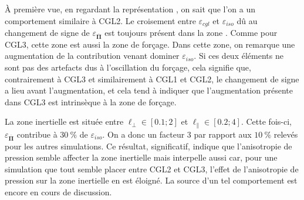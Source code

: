  À première vue, en regardant la représentation , on sait que l'on a un comportement similaire à CGL2. Le croisement entre $\varepsilon_{cgl}$ et $\varepsilon_{iso}$ dû au changement de signe de $\varepsilon_{\overline{\boldsymbol{\Pi}}}$ est toujours présent dans la zone . Comme pour CGL3, cette zone est aussi la zone de forçage. Dans cette zone, on remarque une augmentation de la contribution venant dominer $\varepsilon_{iso}$. Si ces deux éléments ne sont pas des artefacts dus à l'oscillation du forçage, cela signifie que, contrairement à CGL3 et similairement à CGL1 et CGL2, le changement de signe a lieu avant l'augmentation, et cela tend à indiquer que l'augmentation présente dans CGL3 est intrinsèque à la zone de forçage.
 
 La zone inertielle est située entre $\ell_{\perp} \in [\num{0.1};\num{2}]$ et $\ell_{\parallel} \in [\num{0.2};\num{4}]$. Cette fois-ci, $\varepsilon_{\overline{\boldsymbol{\Pi}}}$ contribue à $\SI{30}{\%}$ de $\varepsilon_{iso}$. On a donc un facteur 3 par rapport aux $\SI{10}{\%}$ relevés pour les autres simulations. Ce résultat, significatif, indique que l'anisotropie de pression semble affecter la zone inertielle mais interpelle aussi car, pour une simulation que tout semble placer entre CGL2 et CGL3, l'effet de l'anisotropie de pression sur la zone inertielle en est éloigné. La source d'un tel comportement est encore en cours de discussion. 
  

